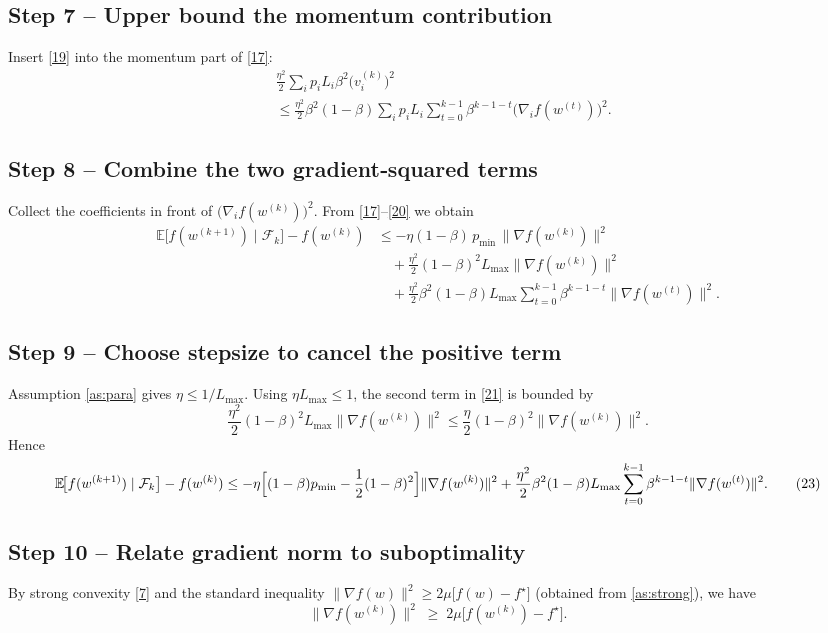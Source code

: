 \documentclass{article}
\newcommand{\E}{\mathbb{E}}
\begin{document}
\subsection*{Step 7 – Upper bound the momentum contribution}
Insert \eqref{19} into the momentum part of \eqref{17}:
\[
\begin{aligned}
    &\frac{\eta^{2}}{2}\sum_{i}p_i L_i \beta^{2}\bigl(v_i^{(k)}\bigr)^{2}\\
    &\le \frac{\eta^{2}}{2}\beta^{2}(1-\beta)
        \sum_{i}p_i L_i\sum_{t=0}^{k-1}\beta^{k-1-t}
            \bigl(\nabla_i f(w^{(t)})\bigr)^{2}.
\end{aligned}
\tag{20}
\]

\subsection*{Step 8 – Combine the two gradient‑squared terms}
Collect the coefficients in front of $\bigl(\nabla_i f(w^{(k)})\bigr)^{2}$.
From \eqref{17}–\eqref{20} we obtain
\[
\begin{aligned}
    \E\!\bigl[f(w^{(k+1)})\mid\mathcal{F}_k\bigr]-f(w^{(k)})
    &\le -\eta(1-\beta)\,p_{\min}\,\|\nabla f(w^{(k)})\|^{2} \\
    &\quad +\frac{\eta^{2}}{2} (1-\beta)^{2} L_{\max}
        \|\nabla f(w^{(k)})\|^{2} \\
    &\quad +\frac{\eta^{2}}{2}\beta^{2}(1-\beta)
        L_{\max}\sum_{t=0}^{k-1}\beta^{k-1-t}
        \|\nabla f(w^{(t)})\|^{2}.
\end{aligned}
\tag{21}
\]

\subsection*{Step 9 – Choose stepsize to cancel the positive term}
Assumption \ref{as:para} gives $\eta\le 1/L_{\max}$.  Using $\eta L_{\max}\le 1$,
the second term in \eqref{21} is bounded by
\[
    \frac{\eta^{2}}{2}(1-\beta)^{2}L_{\max}\|\nabla f(w^{(k)})\|^{2}
    \le \frac{\eta}{2}(1-\beta)^{2}\|\nabla f(w^{(k)})\|^{2}.
\tag{22}
\]
Hence
\[
    \E\!\bigl[f(w^{(k+1)})\mid\mathcal{F}_k\bigr]-f(w^{(k)})
    \le -\eta\Bigl[(1-\beta)p_{\min}
          -\frac{1}{2}(1-\beta)^{2}\Bigr]\|\nabla f(w^{(k)})\|^{2}
      +\frac{\eta^{2}}{2}\beta^{2}(1-\beta)L_{\max}
        \sum_{t=0}^{k-1}\beta^{k-1-t}
        \|\nabla f(w^{(t)})\|^{2}.
\tag{23}
\]

\subsection*{Step 10 – Relate gradient norm to suboptimality}
By strong convexity \eqref{7} and the standard inequality
$\|\nabla f(w)\|^{2}\ge 2\mu\bigl[f(w)-f^{\star}\bigr]$ (obtained from
\ref{as:strong}), we have
\[
    \|\nabla f(w^{(k)})\|^{2}\;\ge\;2\mu\bigl[f(w^{(k)})-f^{\star}\bigr].
\tag{24}
\]
\end{document}
